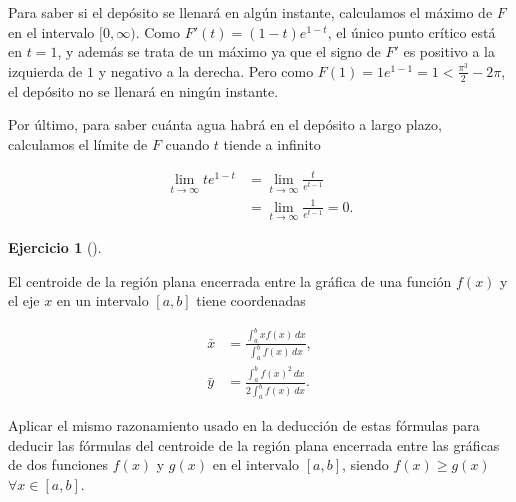\documentclass[
  a4paper,
]{scrreport}
\theoremstyle{definition}
\newtheorem{exercise}{Ejercicio}[chapter]
\theoremstyle{remark}
\begin{document}
\begin{tcolorbox}
Para saber si el depósito se llenará en algún instante, calculamos el
máximo de \(F\) en el intervalo \([0, \infty)\). Como
\(F'(t) = (1-t)e^{1-t}\), el único punto crítico está en \(t=1\), y
además se trata de un máximo ya que el signo de \(F'\) es positivo a la
izquierda de \(1\) y negativo a la derecha. Pero como
\(F(1) = 1e^{1-1} = 1 < \frac{\pi^3}{2} - 2\pi\), el depósito no se
llenará en ningún instante.

Por último, para saber cuánta agua habrá en el depósito a largo plazo,
calculamos el límite de \(F\) cuando \(t\) tiende a infinito

\begin{align*}
\lim_{t \to \infty} te^{1-t} 
&= \lim_{t \to \infty} \frac{t}{e^{t-1}} \tag{L'Hôpital} \\
&= \lim_{t \to \infty} \frac{1}{e^{t-1}} 
= 0.
\end{align*}

\end{tcolorbox}

\begin{exercise}[]\protect\hypertarget{exr-4}{}\label{exr-4}

El centroide de la región plana encerrada entre la gráfica de una
función \(f(x)\) y el eje \(x\) en un intervalo \([a,b]\) tiene
coordenadas

\begin{align*}
\bar x &= \frac{\int_a^b x f(x)\,dx}{\int_a^b f(x)\,dx},\\
\bar y &= \frac{\int_a^b f(x)^2\, dx}{2\int_a^b f(x)\,dx}.
\end{align*}

Aplicar el mismo razonamiento usado en la deducción de estas fórmulas
para deducir las fórmulas del centroide de la región plana encerrada
entre las gráficas de dos funciones \(f(x)\) y \(g(x)\) en el intervalo
\([a,b]\), siendo \(f(x)\geq g(x)\) \(\forall x\in[a,b]\).

\end{exercise}
\end{document}
